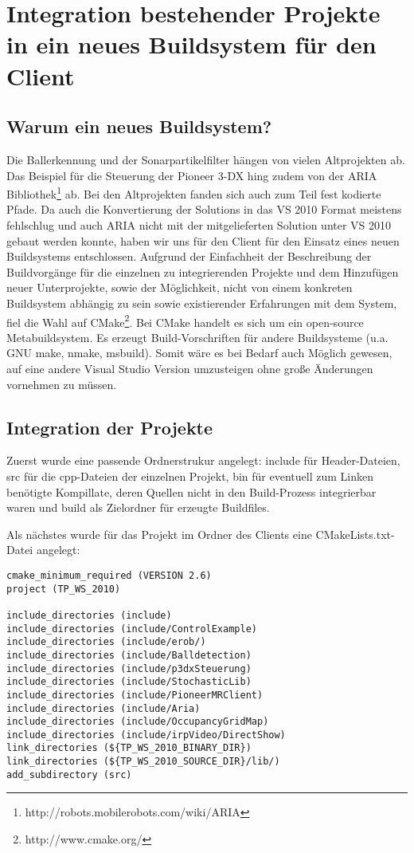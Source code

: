 \section{Integration bestehender Projekte in ein neues Buildsystem für den
Client}
\label{cha:integr-best-proj}
\subsection{Warum ein neues Buildsystem?}
Die Ballerkennung und der Sonarpartikelfilter hängen von vielen
Altprojekten
ab. Das Beispiel für die Steuerung der Pioneer 3-DX hing zudem von der ARIA
Bibliothek\footnote{http://robots.mobilerobots.com/wiki/ARIA} ab. Bei den
Altprojekten fanden sich auch zum Teil fest kodierte Pfade. Da auch die
Konvertierung der Solutions in das VS 2010 Format meistens fehlschlug und
auch
ARIA nicht mit der mitgelieferten Solution unter VS 2010 gebaut werden
konnte,
haben wir uns für den Client für den Einsatz eines neuen Buildsystems
entschlossen. Aufgrund der Einfachheit der Beschreibung der Buildvorgänge
für
die einzelnen zu integrierenden Projekte und dem Hinzufügen neuer
Unterprojekte, sowie der Möglichkeit, nicht von einem konkreten Buildsystem
abhängig
zu sein sowie existierender Erfahrungen mit dem System, fiel die Wahl auf
CMake\footnote{http://www.cmake.org/}. Bei CMake handelt es sich um ein
open-source Metabuildsystem. Es erzeugt Build-Vorschriften für andere
Buildsysteme (u.a. GNU make, nmake, msbuild). Somit wäre es bei Bedarf auch
Möglich gewesen, auf eine andere Visual Studio Version umzusteigen ohne große
Änderungen vornehmen zu müssen.

\subsection{Integration der Projekte}
Zuerst wurde eine passende Ordnerstrukur angelegt: include für
Header-Dateien,
src für die cpp-Dateien der einzelnen Projekt, bin für eventuell zum Linken
 benötigte
Kompillate, deren Quellen nicht in den Build-Prozess integrierbar waren und
build als Zielordner für erzeugte Buildfiles.

Als nächstes wurde für das Projekt im Ordner des Clients eine
CMakeLists.txt-Datei angelegt:

\begin{lstlisting}[language={},captionpos=b,caption={CMakeLists.txt für das Buildsystem des Clients}]
cmake_minimum_required (VERSION 2.6)
project (TP_WS_2010)

include_directories (include)
include_directories (include/ControlExample)
include_directories (include/erob/)
include_directories (include/Balldetection)
include_directories (include/p3dxSteuerung)
include_directories (include/StochasticLib)
include_directories (include/PioneerMRClient)
include_directories (include/Aria)
include_directories (include/OccupancyGridMap)
include_directories (include/irpVideo/DirectShow)
link_directories (${TP_WS_2010_BINARY_DIR})
link_directories (${TP_WS_2010_SOURCE_DIR}/lib/)
add_subdirectory (src)
\end{lstlisting}

